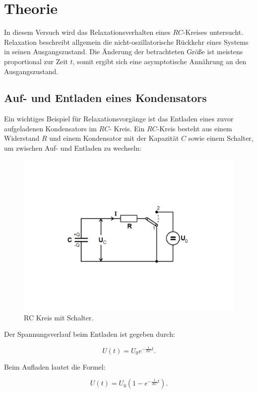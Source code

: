 \section{Theorie}
\label{sec:Theorie}

In diesem Versuch wird das Relaxationsverhalten eines $RC$-Kreises untersucht.
Relaxation beschreibt allgemein die nicht-oszillatorische Rückkehr eines Systems in seinen Ausgangszustand.
Die Änderung der betrachteten Größe ist meistens proportional zur Zeit $t$, somit ergibt sich eine asymptotische
Annährung an den Ausgangszustand.\cite{v353}

\subsection{Auf- und Entladen eines Kondensators}
Ein wichtiges Beispiel für Relaxationsvorgänge ist das Entladen eines zuvor aufgeladenen Kondensators im $RC$- Kreis.
Ein $RC$-Kreis besteht aus einem Widerstand $R$ und einem Kondensator mit der Kapazität $C$ sowie einem Schalter, um zwischen 
Auf- und Entladen zu wechseln:
\begin{figure}
    \centering
    \includegraphics[height=8cm]{content/Theorie - RC-Kreis.pdf}
    \caption{RC Kreis mit Schalter. \cite{v353}}
    \label{fig:Theorie - RC_Kreis}
\end{figure}

Der Spannungsverlauf beim Entladen ist gegeben durch:

\begin{equation}
    U(t)= U_{0}e^{-\frac{1}{RC}t} . \label{eqn:Entladen}
\end{equation}

Beim Aufladen lautet die Formel:

\begin{equation}
    U(t)= U_{0}(1-e^{-\frac{1}{RC}t}) . \label{eqn:Aufladen}
\end{equation}

